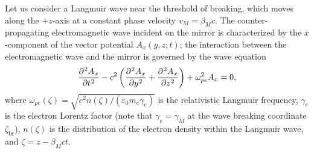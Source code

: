 \documentclass[10pt, a4paper, twoside, openright]{report}
\begin{document}
Let us consider a Langmuir wave near the threshold of breaking, which moves along the $ +z $-axis at a constant phase velocity $ v_{M} = \beta_M c $. The counter-propagating electromagnetic wave incident on the mirror is characterized by the $ x $-component of the vector potential $ A_x \left( y, z; t \right) $; the interaction between the electromagnetic wave and the mirror is governed by the wave equation
\begin{equation}\label{eq:refl_coeff_vector_potential}
	\diffp[2]{A_x}{t} - c^2 \left( \diffp[2]{A_x}{y} + \diffp[2]{A_x}{z} \right) + \omega_{pe}^2 A_x = 0,
\end{equation}
where $ \omega_{pe} \left( \zeta \right) = \sqrt{e^2 n\left( \zeta \right) / \left( \varepsilon_0 m_e \gamma_e \right)} $ is the relativistic Langmuir frequency, $ \gamma_e $ is the electron Lorentz factor (note that $ \gamma_e = \gamma_M $ at the wave breaking coordinate $ \zeta_{\mathrm{br}} $), $ n \left( \zeta \right) $ is the distribution of the electron density within the Langmuir wave, and $ \zeta = z - \beta_M c t $. 

\end{document}
